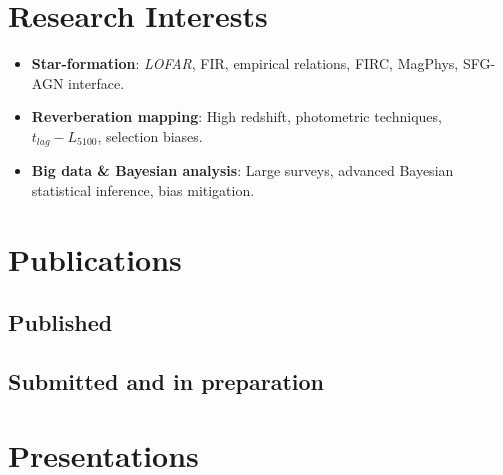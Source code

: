 \documentclass[letterpaper]{twentysecondcv} %
\begin{document}
\section{Research Interests}
\begin{itemize}
    \item \textbf{Star-formation}: \textit{LOFAR}, FIR, empirical relations, FIRC, MagPhys, SFG-AGN interface.
    \item \textbf{Reverberation mapping}: High redshift, photometric techniques, $t_{lag}-L_{5100}$, selection biases.
    \item \textbf{Big data \& Bayesian analysis}: Large surveys, advanced Bayesian statistical inference, bias mitigation.
\end{itemize}

\newpage
{}
\section{Publications}
\subsection{Published}
\begin{itemize}
\end{itemize}

\subsection{Submitted and in preparation}
\begin{itemize}
\end{itemize}

\section{Presentations}
\begin{twenty}
    \\
    
    \\
    
    \\
    
    \\
\end{twenty}
\end{document}
